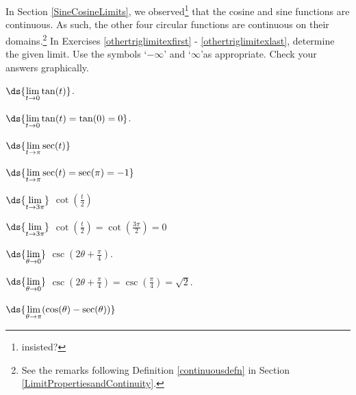 \documentclass{ximera}
\begin{document}
\begin{question}
In Section \ref{SineCosineLimits}, we observed\footnote{insisted?} that the cosine and sine functions are continuous.  As such, the other four circular functions are continuous on their domains.\footnote{See the remarks following Definition \ref{continuousdefn} in Section \ref{LimitPropertiesandContinuity}.} 
\smallskip
In Exercises \ref{othertriglimitexfirst} - \ref{othertriglimitexlast}, determine the given limit.  Use the symbols `$-\infty$' and `$\infty$'as appropriate.  Check your answers graphically.

\begin{problem}\label{othertriglimitexfirst} 
    $\ds{\lim_{t \rightarrow 0} \tan(t)}$.

    \begin{solution}
        $\ds{\lim_{t \rightarrow 0} \tan(t) = \tan(0) = 0}$.
    \end{solution}
\end{problem}

\begin{problem}
    $\ds{\lim_{t \rightarrow \pi} \sec(t)}$

    \begin{solution}
        $\ds{\lim_{t \rightarrow \pi} \sec(t) = \sec(\pi) = -1}$
    \end{solution}
\end{problem}

\begin{problem}
    $\ds{\lim_{t \rightarrow 3\pi}}$ $\cot\left(\frac{t}{2}\right)$
    
\begin{solution}
    $\ds{\lim_{t \rightarrow 3\pi}}$ $\cot\left(\frac{t}{2}\right) = \cot\left(\frac{3\pi}{2}\right) = 0$
\end{solution}
    
\end{problem}

\begin{problem}
     $\ds{\lim_{\theta \rightarrow 0}}$ $\csc\left(2\theta + \frac{\pi}{4}\right)$.

     \begin{solution}
         $\ds{\lim_{\theta \rightarrow 0}}$ $\csc\left(2\theta + \frac{\pi}{4}\right) = \csc\left(\frac{\pi}{4}\right) = \sqrt{2}$.
     \end{solution}
\end{problem}

\begin{problem}
    $\ds{\lim_{\theta \rightarrow \pi} (\cos(\theta)  -  \sec(\theta))}$


\end{problem}
\end{question}
\end{document}
